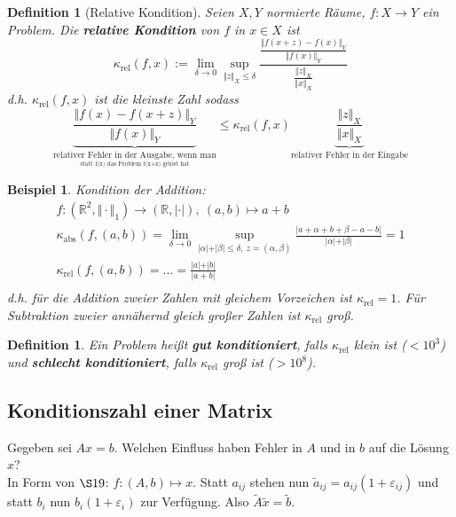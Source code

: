 \documentclass[12pt]{article}
\theoremstyle{break}
\newtheorem{definition}[theorem]{Definition}
\newtheorem{example}[theorem]{Beispiel}
\begin{document}
\begin{definition}[Relative Kondition]
Seien $X, Y$ normierte Räume, $f: X \rightarrow Y$ ein Problem. Die \textbf{relative Kondition} von $f$ in $x \in X$ ist
$$\kappa_{\text{rel}}(f,x) := \lim_{\delta \rightarrow 0} \sup_{\Vert z \Vert_X \leq \delta} \frac{\frac{\Vert f(x+z) - f(x) \Vert_Y}{\Vert f(x) \Vert_Y}}{\frac{\Vert z \Vert_X}{\Vert x \Vert_X}} $$
d.h. $\kappa_{\text{rel}}(f,x)$ ist die kleinste Zahl sodass 
$$\underbrace{\frac{\Vert f(x) - f(x+z) \Vert_Y}{\Vert f(x) \Vert_Y}}_{\underset{\text{statt f(x) das Problem f(x+z) gelöst hat}}{\text{relativer Fehler in der Ausgabe, wenn man}}} \leq \kappa_{\text{rel}}(f,x) \underbrace{\frac{\Vert z \Vert_X}{\Vert x \Vert_X}}_{\text{relativer Fehler in der Eingabe}}$$
\end{definition}

\begin{example}
Kondition der Addition:
\begin{align*}
&f: (\mathbb{R}^2, \Vert \cdot \Vert_1) \rightarrow (\mathbb{R}, \vert \cdot \vert), \medspace (a, b) \mapsto a+b &\\
&\kappa_{\text{abs}}(f,(a,b)) = \lim_{\delta \rightarrow 0} \sup_{\vert \alpha \vert + \vert \beta \vert \leq \delta, \medspace z = (\alpha, \beta)} \frac{\vert a + \alpha + b + \beta - a - b \vert}{\vert \alpha \vert + \vert \beta \vert} = 1 &\\
&\kappa_{\text{rel}}(f,(a,b)) = ... = \frac{\vert a \vert + \vert b \vert}{\vert a+b\vert} &\\
\end{align*}
d.h. für die Addition zweier Zahlen mit gleichem Vorzeichen ist $\kappa_{\text{rel}} = 1$. Für Subtraktion zweier annähernd gleich großer Zahlen ist $\kappa_{\text{rel}}$ groß.
\end{example}

\begin{definition}
Ein Problem heißt \textbf{gut konditioniert}, falls $\kappa_{\text{rel}}$ klein ist ($< 10^3$) und \textbf{schlecht konditioniert}, falls $\kappa_{\text{rel}}$ groß ist ($>10^8$).
\end{definition}

\subsection{Konditionszahl einer Matrix}
Gegeben sei $Ax = b$. Welchen Einfluss haben Fehler in $A$ und in $b$ auf die Lösung $x$?\\
In Form von $\S 19$: $f\colon (A, b) \mapsto x$. Statt $a_{ij}$ stehen nun $\tilde{a}_{ij}= a_{ij}(1+ \varepsilon_{ij})$ und statt $b_i$ nun $b_i(1+ \varepsilon_{i})$ zur Verfügung. Also $\tilde{A} \tilde{x} = \tilde{b}$. 
\end{document}
